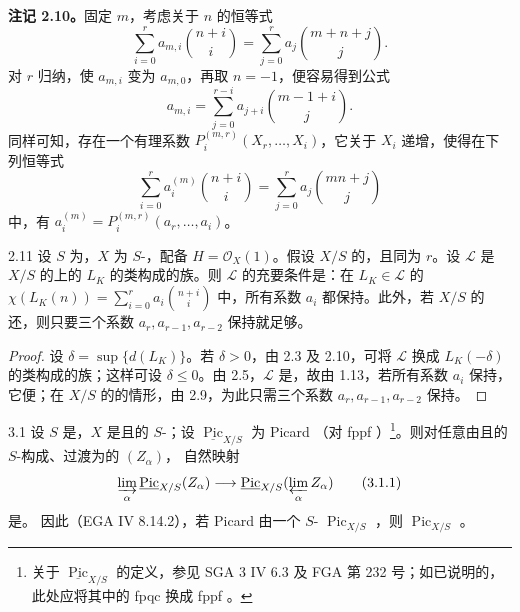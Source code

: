 \textbf{注记 2.10。}固定 $m$，考虑关于 $n$ 的恒等式
\[\sum_{i=0}^r a_{m,i}\binom{n+i}{i}=\sum_{j=0}^r a_j\binom{m+n+j}{j}.\]
对 $r$ 归纳，使 $a_{m,i}$ 变为 $a_{m,0}$，再取 $n=-1$，便容易得到公式
\[a_{m,i}=\sum_{j=0}^{r-i}a_{j+i}\binom{m-1+i}{j}.\]
同样可知，存在一个有理系数 $P_i^{(m,r)}(X_r,\ldots,X_i)$，它关于 $X_i$ 递增，使得在下列恒等式
\[\sum_{i=0}^r a_i^{(m)}\binom{n+i}{i}=\sum_{j=0}^r a_j\binom{mn+j}{j}\]
中，有 $a_i^{(m)}=P_i^{(m,r)}(a_r,\ldots,a_i)$。
\begin{SGAresult}{}{2.11}
设 $S$ 为，$X$ 为 $S$-，配备 $H=\mathcal O_X(1)$。假设 $X/S$ 的，且同为 $r$。设 $\mathscr L$ 是 $X/S$ 的上的 $L_K$ 的类构成的族。则 $\mathscr L$ 的充要条件是：在 $L_K\in\mathscr L$ 的 $\chi(L_K(n))=\sum_{i=0}^r a_i\binom{n+i}{i}$ 中，所有系数 $a_i$ 都保持。此外，若 $X/S$ 的还，则只要三个系数 $a_r,a_{r-1},a_{r-2}$ 保持就足够。
\end{SGAresult}
\begin{proof}
设 $\delta=\sup\{d(L_K)\}$。若 $\delta>0$，由 2.3 及 2.10，可将 $\mathscr L$ 换成 $L_K(-\delta)$ 的类构成的族；这样可设 $\delta\leq0$。由 2.5，$\mathscr L$ 是，故由 1.13，若所有系数 $a_i$ 保持，它便；在 $X/S$ 的的情形，由 2.9，为此只需三个系数 $a_r,a_{r-1},a_{r-2}$ 保持。
\end{proof}
\begin{SGAresult}{}{3.1}
设 $S$ 是，$X$ 是且的 $S$-；设 $\underline{\operatorname{Pic}}_{X/S}$ 为 Picard （对 fppf ）\footnote{关于 $\underline{\operatorname{Pic}}_{X/S}$ 的定义，参见 SGA 3 IV 6.3 及 FGA 第 232 号；如已说明的，此处应将其中的 fpqc 换成 fppf 。}。则对任意由且的 $S$-构成、过渡为的 $(Z_\alpha)$，
自然映射
\[\varinjlim_\alpha\underline{\operatorname{Pic}}_{X/S}(Z_\alpha)\longrightarrow
\underline{\operatorname{Pic}}_{X/S}(\varprojlim_\alpha Z_\alpha)\tag{3.1.1}\]
是。
因此（EGA IV 8.14.2），若 Picard 由一个 $S$- $\operatorname{Pic}_{X/S}$ ，则 $\operatorname{Pic}_{X/S}$ 。
\end{SGAresult}
